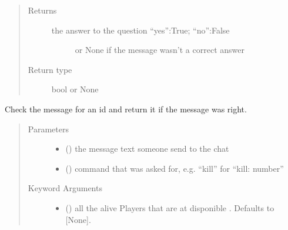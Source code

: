 \documentclass[letterpaper,10pt,english]{sphinxmanual}
\begin{document}
\begin{fulllineitems}
\begin{fulllineitems}
\begin{quote}
\begin{description}
\item[{Returns}] \leavevmode
\begin{description}
\item[{the answer to the question “yes”:True; “no”:False}] \leavevmode
or None if the message wasn’t a correct answer

\end{description}


\item[{Return type}] \leavevmode
bool or None

\end{description}\end{quote}

\end{fulllineitems}


\begin{fulllineitems}
\label{\detokenize{chatwolf:chatwolf.skypecommands.SkypeCommands.get_id}}
Check the message for an id and return it if the message was right.
\begin{quote}\begin{description}
\item[{Parameters}] \leavevmode\begin{itemize}
\item {} 
 () \textendash{} the message text someone send to the chat

\item {} 
 () \textendash{} command that was asked for,
e.g. “kill” for “kill: number”

\end{itemize}

\item[{Keyword Arguments}] \leavevmode\begin{itemize}
\item {} 
 (\sphinxstyleliteralemphasis{\sphinxupquote{, }}) \textendash{} all the alive Players that are at disponible . Defaults to {[}None{]}.


\end{itemize}
\end{description}
\end{quote}
\end{fulllineitems}
\end{fulllineitems}
\end{document}
